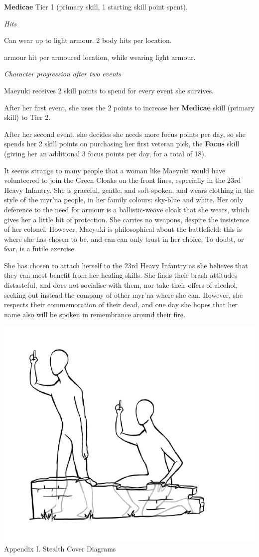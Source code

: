 \textbf{Medicae} Tier 1 (primary skill, 1 starting skill point spent).

\textit{Hits}

Can wear up to light armour. 2 body hits per location.

armour hit per armoured location, while wearing light armour.

\textit{Character progression after two events}

Maeyuki receives 2 skill points to spend for every event she survives.

After her first event, she uses the 2 points to increase her \textbf{Medicae} skill (primary skill) to Tier 2.

After her second event, she decides she needs more focus points per day, so she spends her 2 skill points on purchasing her first veteran pick, the \textbf{Focus} skill (giving her an additional 3 focus points per day, for a total of 18).

It seems strange to many people that a woman like Maeyuki would have volunteered to join the Green Cloaks on the front lines, especially in the 23rd Heavy Infantry. She is graceful, gentle, and soft-spoken, and wears clothing in the style of the myr'na people, in her family colours: sky-blue and white. Her only deference to the need for armour is a ballistic-weave cloak that she wears, which gives her a little bit of protection. She carries no weapons, despite the insistence of her colonel. However, Maeyuki is philosophical about the battlefield: this is where she has chosen to be, and can can only trust in her choice. To doubt, or fear, is a futile exercise.

She has chosen to attach herself to the 23rd Heavy Infantry as she believes that they can most benefit from her healing skills. She finds their brash attitudes distasteful, and does not socialise with them, nor take their offers of alcohol, seeking out instead the company of other myr'na where she can. However, she respects their commemoration of their dead, and one day she hopes that her name also will be spoken in remembrance around their fire.

\includegraphics[width=1\textwidth]{images/image2.png}Appendix I. Stealth Cover Diagrams

